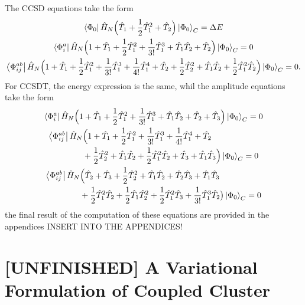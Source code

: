 The CCSD equations take the form 
\begin{gather}
    \bra{\Phi_0} \hat{H}_N
        \Big(\hat{T}_1 + \frac{1}{2}\hat{T}_1^2 + \hat{T}_2\Big)
    \ket{\Phi_0}_C = \Delta E \\
    \bra{\Phi^a_i} \hat{H}_N \Big(
        1 + \hat{T}_1 + \frac{1}{2}\hat{T}_1^2 + \frac{1}{3!}\hat{T}_1^3
        + \hat{T}_1\hat{T}_2 + \hat{T}_2
    \Big) \ket{\Phi_0}_C = 0 \\
    \bra{\Phi^{ab}_{ij}} \hat{H}_N \Big(
        1 + \hat{T}_1 + \frac{1}{2}\hat{T}_1^2 + \frac{1}{3!}\hat{T}_1^3
        + \frac{1}{4!}\hat{T}_1^4 + \hat{T}_2 + \frac{1}{2}\hat{T}_2^2
        + \hat{T}_1 \hat{T}_2 + \frac{1}{2}\hat{T}_1^2 \hat{T}_2
    \Big) \ket{\Phi_0}_C = 0.
\end{gather}
For CCSDT, the energy expression is the same, whil the amplitude equations take
the form 
\begin{gather}
    \bra{\Phi^a_i} \hat{H}_N \Big(
        1 + \hat{T}_1 + \frac{1}{2}\hat{T}_1^2 + \frac{1}{3!}\hat{T}_1^3
        + \hat{T}_1\hat{T}_2 + \hat{T}_2 + \hat{T}_3
    \Big) \ket{\Phi_0}_C = 0 \\
    \begin{aligned}
    \bra{\Phi^{ab}_{ij}} \hat{H}_N& \Big(
        1 + \hat{T}_1 + \frac{1}{2}\hat{T}_1^2 + \frac{1}{3!}\hat{T}_1^3
        + \frac{1}{4!}\hat{T}_1^4 + \hat{T}_2 \\ &+ \frac{1}{2}\hat{T}_2^2
        + \hat{T}_1 \hat{T}_2 + \frac{1}{2}\hat{T}_1^2 \hat{T}_2
        + \hat{T}_3 + \hat{T}_1\hat{T}_3
    \Big) \ket{\Phi_0}_C = 0  
    \end{aligned} \\
    \begin{aligned}
    \bra{\Phi^{ab}_{ij}} \hat{H}_N& \Big(
        \hat{T}_2 + \hat{T}_3 + \frac{1}{2}\hat{T}_2^2 + \hat{T}_1\hat{T}_2
        + \hat{T}_2\hat{T}_3 + \hat{T}_1\hat{T}_3 \\
        &+ \frac{1}{2}\hat{T}_1^2\hat{T}_2 + \frac{1}{2}\hat{T}_1\hat{T}_2^2
        + \frac{1}{2} \hat{T}_1^2\hat{T}_3 + \frac{1}{3!} \hat{T}_1^3 \hat{T}_2
    \big) \ket{\Phi_0}_C = 0  
    \end{aligned}
\end{gather}
the final result of the computation of these equations are provided in the 
appendices INSERT INTO THE APPENDICES!

\section{[UNFINISHED] A Variational Formulation of Coupled Cluster}

